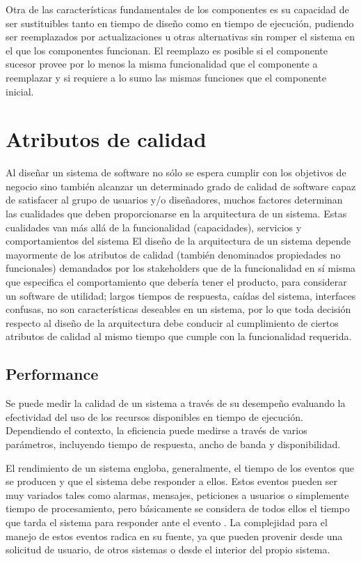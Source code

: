 Otra de las características fundamentales de los componentes es su
capacidad de ser sustituibles tanto en tiempo de diseño como en tiempo
de ejecución, pudiendo ser reemplazados por actualizaciones u otras
alternativas sin romper el sistema en el que los componentes funcionan.
El reemplazo es posible si el componente sucesor provee por lo menos
la misma funcionalidad que el componente a reemplazar y si requiere
a lo sumo las mismas funciones que el componente inicial. 


\section{Atributos de calidad \label{sec:Atributos-de-calidad}}

Al diseñar un sistema de software no sólo se espera cumplir con los
objetivos de negocio sino también alcanzar un determinado grado de
calidad de software capaz de satisfacer al grupo de usuarios y/o diseñadores,
muchos factores determinan las cualidades que deben proporcionarse
en la arquitectura de un sistema. Estas cualidades \cite{Ghahramani2004}
van más allá de la funcionalidad (capacidades), servicios y comportamientos
del sistema El diseño de la arquitectura de un sistema depende mayormente
de los atributos de calidad (también denominados propiedades no funcionales)
demandados por los stakeholders que de la funcionalidad en sí misma
que especifica el comportamiento que debería tener el producto, para
considerar un software de utilidad; largos tiempos de respuesta, caídas
del sistema, interfaces confusas, no son características deseables
en un sistema, por lo que toda decisión respecto al diseño de la arquitectura
debe conducir al cumplimiento de ciertos atributos de calidad al mismo
tiempo que cumple con la funcionalidad requerida. 


\subsection{Performance\label{subsec:Atributos-de-calidad-Performance}}

Se puede medir la calidad de un sistema a través de su desempeño evaluando
la efectividad del uso de los recursos disponibles en tiempo de ejecución.
Dependiendo el contexto, la eficiencia puede medirse a través de varios
parámetros, incluyendo tiempo de respuesta, ancho de banda y disponibilidad. 

El rendimiento de un sistema engloba, generalmente, el tiempo de los
eventos que se producen y que el sistema debe responder a ellos. Estos
eventos pueden ser muy variados tales como alarmas, mensajes, peticiones
a usuarios o simplemente tiempo de procesamiento, pero básicamente
se considera de todos ellos el tiempo que tarda el sistema para responder
ante el evento . La complejidad para el manejo de estos eventos radica
en su fuente, ya que pueden provenir desde una solicitud de usuario,
de otros sistemas o desde el interior del propio sistema. 

